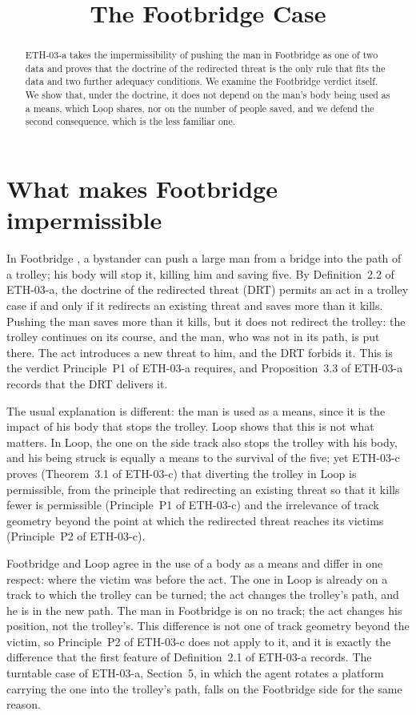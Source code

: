\documentclass{situationist-preprint}
\title{The Footbridge Case}
\begin{document}
\maketitle

\begin{abstract}
ETH-03-a takes the impermissibility of pushing the man in Footbridge as one of two data and proves that the doctrine of the redirected threat is the only rule that fits the data and two further adequacy conditions. We examine the Footbridge verdict itself. We show that, under the doctrine, it does not depend on the man's body being used as a means, which Loop shares, nor on the number of people saved, and we defend the second consequence, which is the less familiar one.
\end{abstract}

\section{What makes Footbridge impermissible}

In Footbridge \citep{Thomson1985}, a bystander can push a large man from a bridge into the path of a trolley; his body will stop it, killing him and saving five. By Definition~2.2 of ETH-03-a, the doctrine of the redirected threat (DRT) permits an act in a trolley case if and only if it redirects an existing threat and saves more than it kills. Pushing the man saves more than it kills, but it does not redirect the trolley: the trolley continues on its course, and the man, who was not in its path, is put there. The act introduces a new threat to him, and the DRT forbids it. This is the verdict Principle~P1 of ETH-03-a requires, and Proposition~3.3 of ETH-03-a records that the DRT delivers it.

The usual explanation is different: the man is used as a means, since it is the impact of his body that stops the trolley. Loop shows that this is not what matters. In Loop, the one on the side track also stops the trolley with his body, and his being struck is equally a means to the survival of the five; yet ETH-03-c proves (Theorem~3.1 of ETH-03-c) that diverting the trolley in Loop is permissible, from the principle that redirecting an existing threat so that it kills fewer is permissible (Principle~P1 of ETH-03-c) and the irrelevance of track geometry beyond the point at which the redirected threat reaches its victims (Principle~P2 of ETH-03-c).

Footbridge and Loop agree in the use of a body as a means and differ in one respect: where the victim was before the act. The one in Loop is already on a track to which the trolley can be turned; the act changes the trolley's path, and he is in the new path. The man in Footbridge is on no track; the act changes his position, not the trolley's. This difference is not one of track geometry beyond the victim, so Principle~P2 of ETH-03-c does not apply to it, and it is exactly the difference that the first feature of Definition~2.1 of ETH-03-a records. The turntable case of ETH-03-a, Section~5, in which the agent rotates a platform carrying the one into the trolley's path, falls on the Footbridge side for the same reason.
\end{document}
